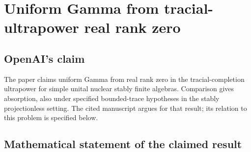 \documentclass[11pt]{article}
\begin{document}
\section*{Uniform Gamma from tracial-ultrapower real rank zero}

\subsection{OpenAI's claim}
The paper claims uniform Gamma from real rank zero in the tracial-completion ultrapower for simple unital nuclear stably finite algebras. Comparison gives absorption, also under specified bounded-trace hypotheses in the stably projectionless setting. The cited manuscript argues for that result; its relation to this problem is specified below.

\subsection{Mathematical statement of the claimed result}
\end{document}
